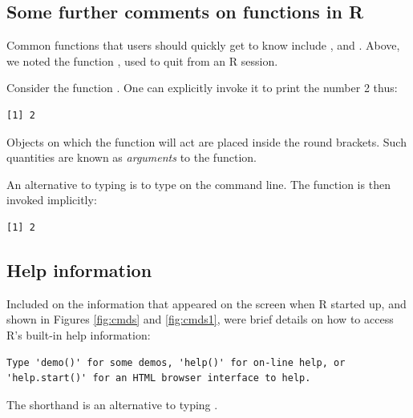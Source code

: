 \subsection{Some further comments on functions in R}

 Common functions that users
  should quickly get to know include , 
  and .  Above, we noted the function , used
  to quit from an R session.

Consider the function . One can explicitly invoke it to print the
number 2 thus:
\begin{knitrout}
\color{fgcolor}\begin{kframe}
\begin{alltt}
\hlstd{(}\hlstd{)}
\end{alltt}
\begin{verbatim}
[1] 2
\end{verbatim}
\end{kframe}
\end{knitrout}
Objects on which the function will act are placed inside the round
brackets.  Such quantities are known as {\em arguments} to the function.

An alternative to typing  is to
type  on the command line.  The function 
is then invoked implicitly:
\begin{knitrout}
\color{fgcolor}\begin{kframe}
\begin{alltt}
\end{alltt}
\begin{verbatim}
[1] 2
\end{verbatim}
\end{kframe}
\end{knitrout}

\subsection{Help information}\label{ss:ch1-help}

Included on the information that appeared on the screen when R started
up, and shown in Figures \ref{fig:cmds} and \ref{fig:cmds1}, were brief
details on how to access R's built-in help information:
{\small
\begin{verbatim}
Type 'demo()' for some demos, 'help()' for on-line help, or
'help.start()' for an HTML browser interface to help.
\end{verbatim}
}
\noindent
The shorthand  is an alternative to typing
.

